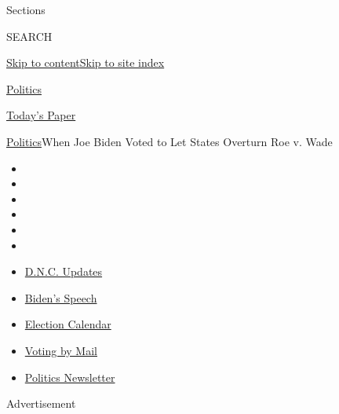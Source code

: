 Sections

SEARCH

\protect\hyperlink{site-content}{Skip to
content}\protect\hyperlink{site-index}{Skip to site index}

\href{https://www.nytimes3xbfgragh.onion/section/politics}{Politics}

\href{https://myaccount.nytimes3xbfgragh.onion/auth/login?response_type=cookie\&client_id=vi}{}

\href{https://www.nytimes3xbfgragh.onion/section/todayspaper}{Today's
Paper}

\href{/section/politics}{Politics}\textbar{}When Joe Biden Voted to Let
States Overturn Roe v. Wade

\begin{itemize}
\item
\item
\item
\item
\item
\item
\end{itemize}

\begin{itemize}
\item
  \href{https://www.nytimes3xbfgragh.onion/live/2020/08/20/us/dnc-convention-election?action=click\&pgtype=Article\&state=default\&region=TOP_BANNER\&context=storylines_menu}{D.N.C.
  Updates}
\item
  \href{https://www.nytimes3xbfgragh.onion/2020/08/20/us/politics/biden-presidential-nomination-dnc.html?action=click\&pgtype=Article\&state=default\&region=TOP_BANNER\&context=storylines_menu}{Biden's
  Speech}
\item
  \href{https://www.nytimes3xbfgragh.onion/interactive/2019/us/elections/2020-presidential-election-calendar.html?action=click\&pgtype=Article\&state=default\&region=TOP_BANNER\&context=storylines_menu}{Election
  Calendar}
\item
  \href{https://www.nytimes3xbfgragh.onion/interactive/2020/08/11/us/politics/vote-by-mail-us-states.html?action=click\&pgtype=Article\&state=default\&region=TOP_BANNER\&context=storylines_menu}{Voting
  by Mail}
\item
  \href{https://www.nytimes3xbfgragh.onion/newsletters/politics?action=click\&pgtype=Article\&state=default\&region=TOP_BANNER\&context=storylines_menu}{Politics
  Newsletter}
\end{itemize}

Advertisement

